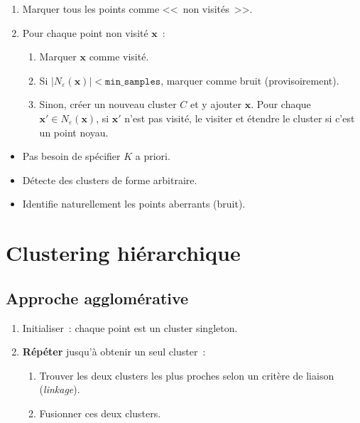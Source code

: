 \begin{algorithme}[title=\textbf{DBSCAN}]
\begin{enumerate}
  \item Marquer tous les points comme <<~non visit\'es~>>.
  \item Pour chaque point non visit\'e $\bm{x}$~:
    \begin{enumerate}
      \item Marquer $\bm{x}$ comme visit\'e.
      \item Si $|N_\varepsilon(\bm{x})| < \texttt{min\_samples}$, marquer comme
        bruit (provisoirement).
      \item Sinon, cr\'eer un nouveau cluster $C$ et y ajouter $\bm{x}$.
        Pour chaque $\bm{x}' \in N_\varepsilon(\bm{x})$, si $\bm{x}'$ n'est
        pas visit\'e, le visiter et \'etendre le cluster si c'est un point noyau.
    \end{enumerate}
\end{enumerate}
\end{algorithme}

\begin{bonnepratique}[title=\textbf{Avantages de DBSCAN}]
\begin{itemize}
  \item Pas besoin de sp\'ecifier $K$ a priori.
  \item D\'etecte des clusters de forme arbitraire.
  \item Identifie naturellement les points aberrants (bruit).
\end{itemize}
\end{bonnepratique}

\section{Clustering hi\'erarchique}
\label{sec:hierarchique}

\subsection{Approche agglom\'erative}

\begin{algorithme}[title=\textbf{Clustering agglom\'eratif}]
\begin{enumerate}
  \item Initialiser~: chaque point est un cluster singleton.
  \item \textbf{R\'ep\'eter} jusqu'\`a obtenir un seul cluster~:
    \begin{enumerate}
      \item Trouver les deux clusters les plus proches selon un crit\`ere de
        liaison (\emph{linkage}).
      \item Fusionner ces deux clusters.
    \end{enumerate}
\end{enumerate}
\end{algorithme}

